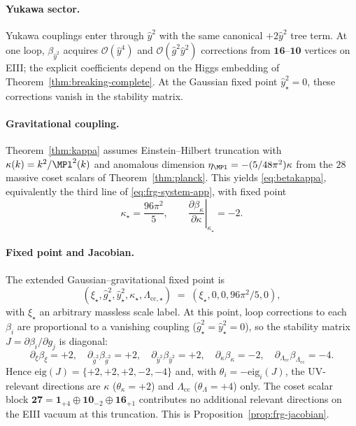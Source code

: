 \paragraph{Yukawa sector.}
Yukawa couplings enter through $\hat y^2$ with the same canonical $+2\hat y^2$
tree term. At one loop, $\beta_{\hat y^2}$ acquires $\mathcal{O}(\hat y^4)$ and
$\mathcal{O}(\hat g^2\hat y^2)$ corrections from $\mathbf{16}$--$\mathbf{10}$
vertices on EIII; the explicit coefficients depend on the Higgs embedding of
Theorem~\ref{thm:breaking-complete}. At the Gaussian fixed point
$\hat y^2_\star=0$, these corrections vanish in the stability matrix.

\paragraph{Gravitational coupling.}
Theorem~\ref{thm:kappa} assumes Einstein--Hilbert truncation with
$\kappa(k)=k^2/\MPl^2(k)$ and anomalous dimension
$\eta_{\MPl}=-(5/48\pi^2)\kappa$ from the $28$ massive coset scalars of
Theorem~\ref{thm:planck}. This yields \eqref{eq:betakappa}, equivalently the
third line of \eqref{eq:frg-system-app}, with fixed point
\begin{equation}\label{eq:kappa-star}
  \kappa_\star=\frac{96\pi^2}{5},
  \qquad
  \left.\frac{\partial\beta_\kappa}{\partial\kappa}\right|_{\kappa_\star}=-2.
\end{equation}

\paragraph{Fixed point and Jacobian.}
The extended Gaussian--gravitational fixed point is
\begin{equation}\label{eq:frg-fp}
  (\xi_\star,\hat g^2_\star,\hat y^2_\star,\kappa_\star,\Lambda_{\mathrm{cc},\star})
  \;=\;
  (\xi_\star,0,0,96\pi^2/5,0),
\end{equation}
with $\xi_\star$ an arbitrary massless scale label. At this point, loop
corrections to each $\beta_i$ are proportional to a vanishing coupling
($\hat g^2_\star=\hat y^2_\star=0$), so the stability matrix
$J=\partial\beta_i/\partial g_j$ is diagonal:
\begin{equation}\label{eq:jacobian-diag}
  \partial_{\xi}\beta_{\xi}=+2,\quad
  \partial_{\hat g^2}\beta_{\hat g^2}=+2,\quad
  \partial_{\hat y^2}\beta_{\hat y^2}=+2,\quad
  \partial_{\kappa}\beta_{\kappa}=-2,\quad
  \partial_{\Lambda_{\mathrm{cc}}}\beta_{\Lambda_{\mathrm{cc}}}=-4.
\end{equation}
Hence $\mathrm{eig}(J)=\{+2,+2,+2,-2,-4\}$ and, with
$\theta_i=-\mathrm{eig}_i(J)$, the UV-relevant directions are $\kappa$
($\theta_\kappa=+2$) and $\Lambda_{\mathrm{cc}}$ ($\theta_{\Lambda}=+4$) only.
The coset scalar block
$\mathbf{27}=\mathbf{1}_{+4}\oplus\mathbf{10}_{-2}\oplus\mathbf{16}_{+1}$
contributes no additional relevant directions on the EIII vacuum at this
truncation. This is Proposition~\ref{prop:frg-jacobian}.

